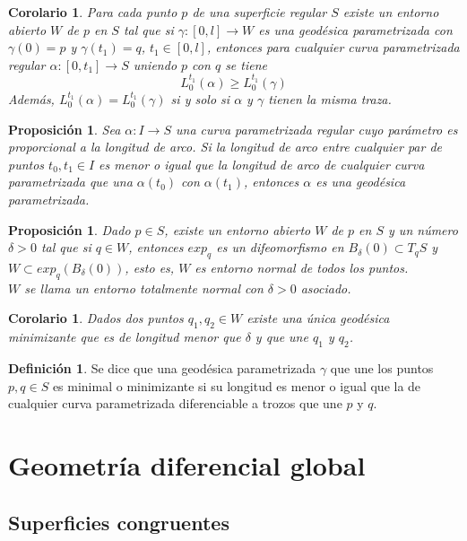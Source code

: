\documentclass{report}
\newtheorem{corollary}[theorem]{Corolario}
\newtheorem{proposition}[theorem]{Proposición}
\theoremstyle{remark}
\theoremstyle{remark}
\theoremstyle{definition}
\newtheorem{definition}{Definición}[chapter]
\theoremstyle{definition}
\theoremstyle{definition}
\begin{document}
\begin{corollary}
    Para cada punto $p$ de una superficie regular $S$ existe un entorno abierto $W$ de $p$ en $S$ tal que si $\gamma : [0, l] \to W$ es una geodésica parametrizada con $\gamma(0) = p$ y $\gamma(t_1) = q$, $t_1 \in [0, l]$, entonces para cualquier curva parametrizada regular $\alpha : [0, t_1] \to S$ uniendo $p$ con $q$ se tiene
    $$L^{t_1}_0(\alpha) \geq L^{t_1}_0(\gamma)$$
    Además, $L^{t_1}_0(\alpha) = L^{t_1}_0(\gamma)$ si y solo si $\alpha$ y $\gamma$ tienen la misma traza.
\end{corollary}

\begin{proposition}
    Sea $\alpha : I \to S$ una curva parametrizada regular cuyo parámetro es proporcional a la longitud de arco.
    Si la longitud de arco entre cualquier par de puntos $t_0, t_1 \in I$ es menor o igual que la longitud de arco de cualquier curva parametrizada que una $\alpha(t_0)$ con $\alpha(t_1)$, entonces $\alpha$ es una geodésica parametrizada.
\end{proposition}

\begin{proposition}
    Dado $p \in S$, existe un entorno abierto $W$ de $p$ en $S$ y un número $\delta>0$ tal que si $q \in W$, entonces $exp_q$ es un difeomorfismo en $B_\delta(0) \subset T_qS$ y $W \subset exp_q(B_\delta(0))$, esto es, $W$ es entorno normal de todos los puntos.\\
    $W$ se llama un entorno totalmente normal con $\delta>0$ asociado.
\end{proposition}

\begin{corollary}
    Dados dos puntos $q_1, q_2 \in W$ existe una única geodésica minimizante que es de longitud menor que $\delta$ y que une $q_1$ y $q_2$.
\end{corollary}

\begin{definition}
    Se dice que una geodésica parametrizada $\gamma$ que une los puntos $p, q \in S$ es minimal o minimizante si su longitud es menor o igual que la de cualquier curva parametrizada diferenciable a trozos que une $p$ y $q$.
\end{definition}

\chapter{Geometría diferencial global}
\section{Superficies congruentes}
\end{document}
